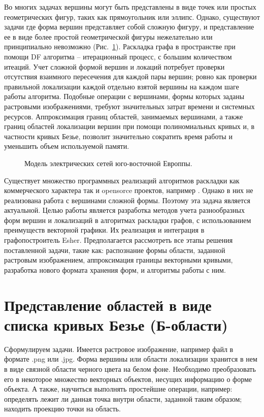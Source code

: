\documentclass[a4paper,12pt]{report}
\begin{document}
Во многих задачах вершины могут быть представлены в виде точек или простых геометрических фигур, таких как прямоугольник или эллипс. Однако, существуют задачи где форма вершин представляет собой сложную фигуру, и представление ее в виде более простой геометрической фигуры нежелательно или принципиально невозможно (Рис.~\ref{ris:network}). Раскладка графа в пространстве при помощи DF алгоритма – итерационный  процесс, с большим количеством итеаций. Учет сложной формой вершин и локаций потребует проверки отсутствия взаимного пересечения для каждой пары вершин; ровно как  проверки правильной локализации каждой отдельно взятой вершины на каждом шаге работы алгоритма.  Подобные операции с  вершинами, формы которых заданы растровыми изображениями, требуют значительных затрат времени и системных ресурсов.  Аппроксимация границ областей, занимаемых вершинами, а также границ областей локализации вершин при помощи полиномиальных кривых и, в частности кривых Безье, позволит значительно сократить время работы и уменьшить объем используемой памяти.

\begin{figure}[h]
\caption{Модель электрических сетей юго-восточной Европпы.}
\label{ris:network}
\end{figure}

Существует множество программных реализаций алгоритмов раскладки как коммерческого характера так и opensorce проектов, например \cite{softwarelist}. Однако в них не реализована работа с вершинами сложной формы. Поэтому эта задача является актуальной. Целью работы является разработка методов учета разнообразных форм вершин и локализаций в алгоритмах раскладки графов, с использованием преимуществ векторной графики. Их реализация и интеграция в  графопостроитель Esher. Предполагается рассмотреть все этапы решения поставленной задачи, такие как: распознание формы области, заданной растровым изображением, аппроксимация границы векторными кривыми, разработка нового формата хранения форм, и алгоритмы работы с ним.

\chapter{Представление областей в виде списка кривых Безье (Б-области)}

Сформулируем задачи. Имеется растровое изображение, например файл в формате .png или .jpg. Форма вершины или области локализации хранится в нем в виде связной области черного цвета на белом фоне. Необходимо преобразовать его в некоторое множество векторных объектов, несущих информацию о форме объекта. А также, научиться выполнять простейшие операции, например: определять лежит ли данная точка внутри области, заданной таким образом; находить проекцию точки на область. 
\end{document}
